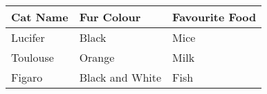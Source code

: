 \documentclass[10pt,a4paper]{article}
\begin{document}
\begin{tabular}{| l | l | l |}\hline
Cat Name 	&Fur Colour 		& Favourite Food	\\ \hline
Lucifer 	& Black 			& Mice 			\\ \hline
Toulouse 	& Orange 			& Milk 			\\ \hline
Figaro 	& Black and White 	& Fish 			\\ \hline
\end{tabular}
\end{document}
